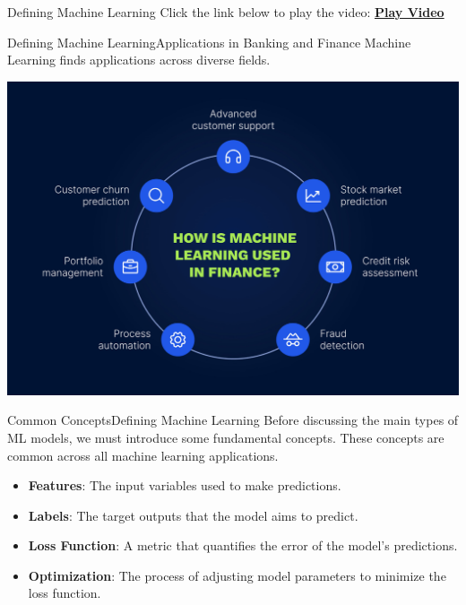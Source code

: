 \documentclass[11pt]{beamer}
\begin{document}
\begin{frame}{Defining Machine Learning}
	Click the link below to play the video: \href{run:training-explication.mp4}{\textbf{Play Video}}
\end{frame}
\begin{frame}{Defining Machine Learning}{Applications in Banking and Finance}
	Machine Learning finds applications across diverse fields.
	\begin{center}
	\includegraphics[scale=0.3]{../05-pictures/lesson-1-1_pic_5.png}
	\end{center}
\end{frame}
%
%
\begin{frame}{Common Concepts}{Defining Machine Learning}
Before discussing the main types of ML models, we must introduce some fundamental concepts. These concepts are common across all machine learning applications.
\vspace{1cm}
    \begin{itemize}
        \item \textbf{Features}: The input variables used to make predictions.
        \item \textbf{Labels}: The target outputs that the model aims to predict.
        \item \textbf{Loss Function}: A metric that quantifies the error of the model’s predictions.
        \item \textbf{Optimization}: The process of adjusting model parameters to minimize the loss function.
    \end{itemize}
\end{frame}
\end{document}
